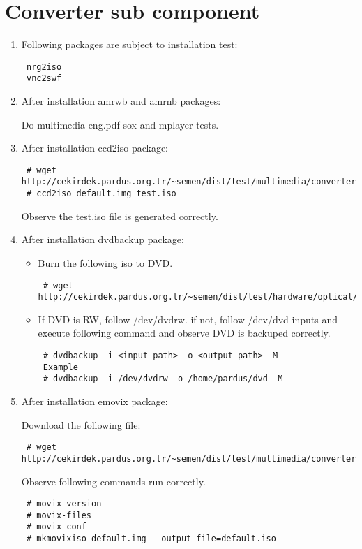 \documentclass[a4paper,10pt]{article}
\begin{document}
\section{Converter sub component}
\begin{enumerate}
 \item Following packages are subject to installation test:
\begin{verbatim}
 nrg2iso
 vnc2swf
\end{verbatim}

 \item After installation amrwb and amrnb packages:

 Do multimedia-eng.pdf sox and mplayer tests.

\item After installation ccd2iso package:
\begin{verbatim}
 # wget http://cekirdek.pardus.org.tr/~semen/dist/test/multimedia/converter/default.img
 # ccd2iso default.img test.iso
\end{verbatim}

Observe the test.iso file is generated correctly.

\item After installation dvdbackup package:
\begin{itemize}
 \item Burn the following iso to DVD. 
\begin{verbatim}
 # wget http://cekirdek.pardus.org.tr/~semen/dist/test/hardware/optical/boot.iso
\end{verbatim}
 \item If DVD is RW, follow /dev/dvdrw. if not, follow /dev/dvd inputs and execute following command and observe DVD is backuped correctly.
\begin{verbatim}
 # dvdbackup -i <input_path> -o <output_path> -M
 Example 
 # dvdbackup -i /dev/dvdrw -o /home/pardus/dvd -M
\end{verbatim}
 
\end{itemize}
\item After installation emovix package:

Download the following file:
\begin{verbatim}
 # wget http://cekirdek.pardus.org.tr/~semen/dist/test/multimedia/converter/default.img
\end{verbatim}
 
Observe following commands run correctly.
\begin{verbatim}
 # movix-version
 # movix-files
 # movix-conf
 # mkmovixiso default.img --output-file=default.iso
\end{verbatim}


\end{enumerate}
\end{document}
